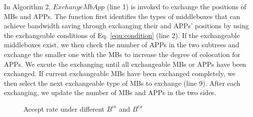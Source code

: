 \documentclass[review]{elsarticle}
\begin{document}
In Algorithm 2, $ExchangeMbApp$ (line 1) is invoked to exchange the positions of MBs and APPs. The function first identifies the types of middleboxes that can achieve bandwidth saving through exchanging their and APPs’ positions by using the exchangeable conditions of Eq. \ref{equ:condition} (line 2). If the exchangeable middleboxes exist, we then check the number of APPs in the two subtrees and exchange the smaller one with the MBs to increase the degree of colocation for APPs. We excute the exchanging until all exchangeable MBs or APPs have been exchanged. If current exchangeable MBs have been exchanged completely, we then select the next exchangeable type of MBs to exchange (line 9). After each exchanging, we update the number of MBs and APPs in the two sides.
\begin{figure}
	\centering

	\caption{Accept rate under different $B^{in}$ and $ B^{ex}$}
	\label{fig:accept_rate}
\end{figure}
\end{document}
